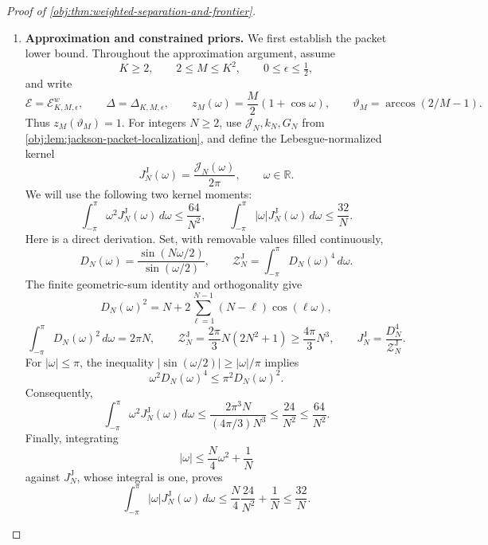 \begin{proof}[Proof of \cref{obj:thm:weighted-separation-and-frontier}]
\begin{enumerate}
\item
\textbf{Approximation and constrained priors.}\quad
We first establish the packet lower bound. Throughout the approximation argument, assume
\[
K\ge2,\qquad 2\le M\le K^2,\qquad 0\le\epsilon\le\tfrac12,
\]
and write
\[
\mathcal E=\mathcal E_{K,M,\epsilon}^{w},
\qquad
\Delta=\Delta_{K,M,\epsilon},
\qquad
z_M(\omega)=\frac M2(1+\cos\omega),
\qquad
\vartheta_M=\arccos(2/M-1).
\]
Thus \(z_M(\vartheta_M)=1\). For integers \(N\ge2\), use
\(\mathcal J_N,k_N,G_N\) from
\cref{obj:lem:jackson-packet-localization}, and define the Lebesgue-normalized kernel
\[
J_N^{\mathrm J}(\omega)=\frac{\mathcal J_N(\omega)}{2\pi},
\qquad \omega\in\mathbb R.
\]
We will use the following two kernel moments:
\[
\int_{-\pi}^{\pi}\omega^2J_N^{\mathrm J}(\omega)\,d\omega
\le\frac{64}{N^2},
\qquad
\int_{-\pi}^{\pi}|\omega|J_N^{\mathrm J}(\omega)\,d\omega
\le\frac{32}{N}.
\]
Here is a direct derivation. Set, with removable values filled continuously,
\[
D_N(\omega)=\frac{\sin(N\omega/2)}{\sin(\omega/2)},
\qquad
\mathcal Z_N^{\mathrm J}
=\int_{-\pi}^{\pi}D_N(\omega)^4\,d\omega.
\]
The finite geometric-sum identity and orthogonality give
\[
D_N(\omega)^2
=N+2\sum_{\ell=1}^{N-1}(N-\ell)\cos(\ell\omega),
\]
\[
\int_{-\pi}^{\pi}D_N(\omega)^2\,d\omega=2\pi N,
\qquad
\mathcal Z_N^{\mathrm J}
=\frac{2\pi}{3}N(2N^2+1)
\ge\frac{4\pi}{3}N^3,
\qquad
J_N^{\mathrm J}=\frac{D_N^4}{\mathcal Z_N^{\mathrm J}}.
\]
For \(|\omega|\le\pi\), the inequality
\(|\sin(\omega/2)|\ge|\omega|/\pi\) implies
\[
\omega^2D_N(\omega)^4\le\pi^2D_N(\omega)^2.
\]
Consequently,
\[
\int_{-\pi}^{\pi}\omega^2J_N^{\mathrm J}(\omega)\,d\omega
\le
\frac{2\pi^3N}{(4\pi/3)N^3}
\le\frac{24}{N^2}
\le\frac{64}{N^2}.
\]
Finally, integrating
\[
|\omega|\le\frac N4\omega^2+\frac1N
\]
against \(J_N^{\mathrm J}\), whose integral is one, proves
\[
\int_{-\pi}^{\pi}|\omega|J_N^{\mathrm J}(\omega)\,d\omega
\le\frac N4\frac{24}{N^2}+\frac1N
\le\frac{32}{N}.
\]


\end{enumerate}
\end{proof}
